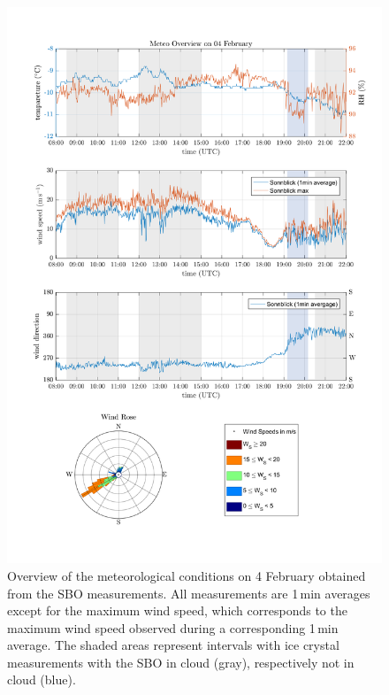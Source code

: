 \documentclass[draft,linenumbers]{agujournal}
\begin{document}
\begin{figure}[t]
 \centering
 	\includegraphics[width=14cm]{MeteoOvervire_0402.png}
 \caption{Overview of the meteorological conditions on 4 February obtained from the SBO measurements. All measurements are 1\,\si{min} averages except for the maximum wind speed, which corresponds to the maximum wind speed observed during a corresponding 1\,\si{min} average. The shaded areas represent intervals with ice crystal measurements with the SBO in cloud (gray), respectively not in cloud (blue). }
 \label{fig:meteo0402}
\end{figure}
\end{document}
